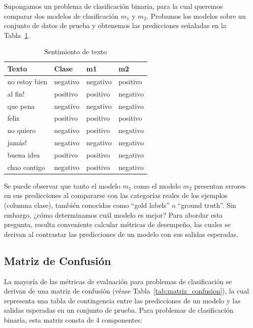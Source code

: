 \begin{example}
Supongamos un problema de clasificación binaria, para la cual queremos comparar dos modelos de clasificación $m_1$ y $m_2$. Probamos los modelos sobre un conjunto de datos de prueba y obtenemos las predicciones señaladas en la Tabla~\ref{tab:ej_sentimiento}.

\begin{table}[htbp]
\centering
\begin{tabular}{|l|l|l|l|}
\hline
\textbf{Texto} & \textbf{Clase} & \textbf{m1} & \textbf{m2} \\
\hline
no estoy bien & negativo & negativo & positivo \\
al fin! & positivo & positivo & negativo \\
que pena & negativo & negativo & negativo \\
feliz & positivo & positivo & positivo \\
no quiero & negativo & positivo & negativo \\
jamás! & negativo & negativo & negativo \\
buena idea & positivo & positivo & negativo \\
chao contigo & negativo & positivo & negativo \\
\hline
\end{tabular}
\caption{Sentimiento de texto}
\label{tab:ej_sentimiento}
\end{table}

Se puede observar que tanto el modelo $m_1$ como el modelo $m_2$ presentan errores en sus predicciones al compararse con las categorías reales de los ejemplos (columna clase), también conocidas como ``gold labels'' o ``ground truth''. Sin embargo, ¿cómo determinamos cuál modelo es mejor? Para abordar esta pregunta, resulta conveniente calcular métricas de desempeño, las cuales se derivan al contrastar las predicciones de un modelo con sus salidas esperadas.
\end{example}

\subsection{Matriz de Confusión}

La mayoría de las métricas de evaluación para problemas de clasificación se derivan de una matriz de confusión (véase Tabla~\ref{tab:matriz_confusion}), la cual representa una tabla de contingencia entre las predicciones de un modelo y las salidas esperadas en un conjunto de prueba. Para problemas de clasificación binaria, esta matriz consta de 4 componentes:


